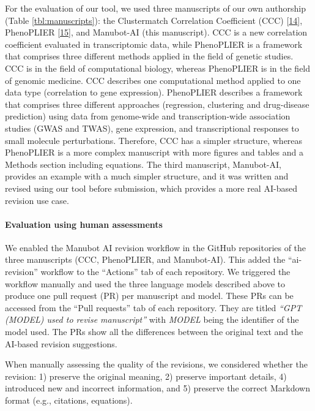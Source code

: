 \documentclass[
]{article}
\begin{document}
For the evaluation of our tool, we used three manuscripts of our own authorship (Table \ref{tbl:manuscripts}): the Clustermatch Correlation Coefficient (CCC) {[}\protect\hyperlink{ref-eirYTTyk}{14}{]}, PhenoPLIER {[}\protect\hyperlink{ref-NM3rHx1i}{15}{]}, and Manubot-AI (this manuscript).
CCC is a new correlation coefficient evaluated in transcriptomic data, while PhenoPLIER is a framework that comprises three different methods applied in the field of genetic studies.
CCC is in the field of computational biology, whereas PhenoPLIER is in the field of genomic medicine.
CCC describes one computational method applied to one data type (correlation to gene expression).
PhenoPLIER describes a framework that comprises three different approaches (regression, clustering and drug-disease prediction) using data from genome-wide and transcription-wide association studies (GWAS and TWAS), gene expression, and transcriptional responses to small molecule perturbations.
Therefore, CCC has a simpler structure, whereas PhenoPLIER is a more complex manuscript with more figures and tables and a Methods section including equations.
The third manuscript, Manubot-AI, provides an example with a much simpler structure, and it was written and revised using our tool before submission, which provides a more real AI-based revision use case.

\hypertarget{evaluation-using-human-assessments}{%
\paragraph{Evaluation using human assessments}\label{evaluation-using-human-assessments}}

We enabled the Manubot AI revision workflow in the GitHub repositories of the three manuscripts (CCC, PhenoPLIER, and Manubot-AI).
This added the ``ai-revision'' workflow to the ``Actions'' tab of each repository.
We triggered the workflow manually and used the three language models described above to produce one pull request (PR) per manuscript and model.
These PRs can be accessed from the ``Pull requests'' tab of each repository.
They are titled \emph{``GPT (MODEL) used to revise manuscript''} with \emph{MODEL} being the identifier of the model used.
The PRs show all the differences between the original text and the AI-based revision suggestions.

When manually assessing the quality of the revisions, we considered whether the revision:
1) preserve the original meaning,
2) preserve important details,
4) introduced new and incorrect information, and
5) preserve the correct Markdown format (e.g., citations, equations).
\end{document}
